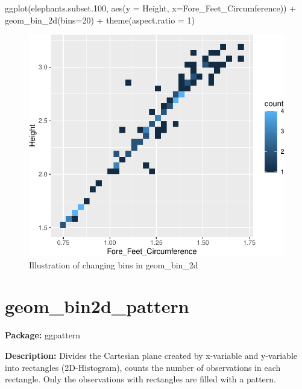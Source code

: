 \documentclass[
]{book}
\newenvironment{Shaded}{\begin{snugshade}}{\end{snugshade}}
\newcommand{\AttributeTok}[1]{\textcolor[rgb]{0.77,0.63,0.00}{#1}}
\newcommand{\DecValTok}[1]{\textcolor[rgb]{0.00,0.00,0.81}{#1}}
\newcommand{\FloatTok}[1]{\textcolor[rgb]{0.00,0.00,0.81}{#1}}
\newcommand{\FunctionTok}[1]{\textcolor[rgb]{0.00,0.00,0.00}{#1}}
\newcommand{\NormalTok}[1]{#1}
\newcommand{\SpecialCharTok}[1]{\textcolor[rgb]{0.00,0.00,0.00}{#1}}
\begin{document}
\begin{Shaded}
\begin{Highlighting}[]
\FunctionTok{ggplot}\NormalTok{(elephants.subset}\FloatTok{.100}\NormalTok{, }\FunctionTok{aes}\NormalTok{(}\AttributeTok{y =}\NormalTok{ Height, }\AttributeTok{x=}\NormalTok{Fore\_Feet\_Circumference)) }\SpecialCharTok{+}
  \FunctionTok{geom\_bin\_2d}\NormalTok{(}\AttributeTok{bins=}\DecValTok{20}\NormalTok{) }\SpecialCharTok{+} 
  \FunctionTok{theme}\NormalTok{(}\AttributeTok{aspect.ratio =} \DecValTok{1}\NormalTok{)}
\end{Highlighting}
\end{Shaded}

\begin{figure}
\centering
\includegraphics{Data-Visualisation-geom-Encyclopedia_files/figure-latex/unnamed-chunk-25-1.pdf}
\caption{\label{fig:unnamed-chunk-25}Illustration of changing bins in geom\_bin\_2d}
\end{figure}

\hypertarget{geom_bin2d_pattern}{%
\section{geom\_bin2d\_pattern}\label{geom_bin2d_pattern}}

\textbf{Package: } ggpattern \autocite{R-ggpattern}

\textbf{Description: } Divides the Cartesian plane created by x-variable and y-variable into rectangles (2D-Histogram), counts the number of observations in each rectangle. Only the observations with rectangles are filled with a pattern.
\end{document}
